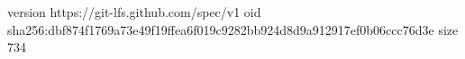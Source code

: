 version https://git-lfs.github.com/spec/v1
oid sha256:dbf874f1769a73e49f19ffea6f019c9282bb924d8d9a912917ef0b06ccc76d3e
size 734
